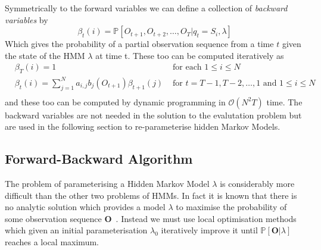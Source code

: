 Symmetrically to the forward variables we can define a collection of \emph{backward variables} by
\begin{equation*}
\beta_t(i) = \mathbb{P}[O_{t+1}, O_{t+2}, \dots, O_T | q_t = S_i, \lambda]
\end{equation*}
Which gives the probability of a partial observation sequence from a time $t$ given the state of the HMM $\lambda$ at time t. These too can be computed iteratively as
\begin{align*}
&\beta_T(i) = 1 &\text{ for each } 1 \leq i \leq N \\
&\beta_t(i)  = \sum_{j=1}^N a_{i,j}b_j(O_{t+1})\beta_{t+1}(j) &\text{ for } t = T-1, T-2,\dots,1 \text{ and } 1 \leq i \leq N \\
\end{align*}
and these too can be computed by dynamic programming in $\mathcal{O}(N^2T)$ time. The backward variables are not needed in the solution to the evalutation problem but are used in the following section to re-parameterise hidden Markov Models. 

\subsection{Forward-Backward Algorithm}
The problem of parameterising a Hidden Markov Model $\lambda$ is considerably more difficult than the other two problems of HMMs. In fact it is known that there is no analytic solution which provides a model $\lambda$ to maximise the probability of some observation sequence $\bm{O}$~\citep{rabiner1989tutorial}. Instead we must use local optimisation methods which given an initial parameterisation $\lambda_0$ iteratively improve it until $\mathbb{P}[\bm{O} | \lambda]$ reaches a local maximum. 

